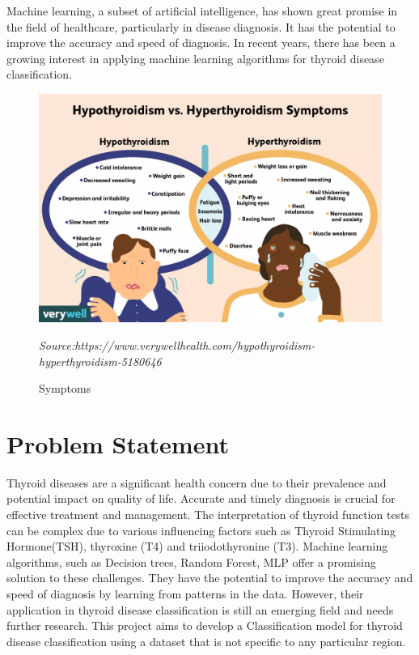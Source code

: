 Machine learning, a subset of artificial intelligence, has shown great promise in the field of healthcare, particularly in disease diagnosis. It has the potential to improve the accuracy and speed of diagnosis. In recent years, there has been a growing interest in applying machine learning algorithms for thyroid disease classification.
\begin{figure}[h]
   
    \includegraphics[scale=0.25]{thyroid.png}
    \caption{Symptoms}
    \label{fig:example}
	\textit{Source:https://www.verywellhealth.com/hypothyroidism-hyperthyroidism-5180646}
    \end{figure}
      
\section{Problem Statement}
Thyroid diseases are a significant health concern due to their prevalence and potential impact on quality of life. Accurate and timely diagnosis is crucial for effective treatment and management. The interpretation of thyroid function tests can be complex due to various influencing factors such as Thyroid Stimulating Hormone(TSH), thyroxine (T4) and triiodothyronine (T3).
Machine learning algorithms, such as Decision trees, Random Forest, MLP offer a promising solution to these challenges. They have the potential to improve the accuracy and speed of diagnosis by learning from patterns in the data. However, their application in thyroid disease classification is still an emerging field and needs further research. This project aims to develop a Classification model for thyroid disease classification using a dataset that is not specific to any particular region.
\newpage
